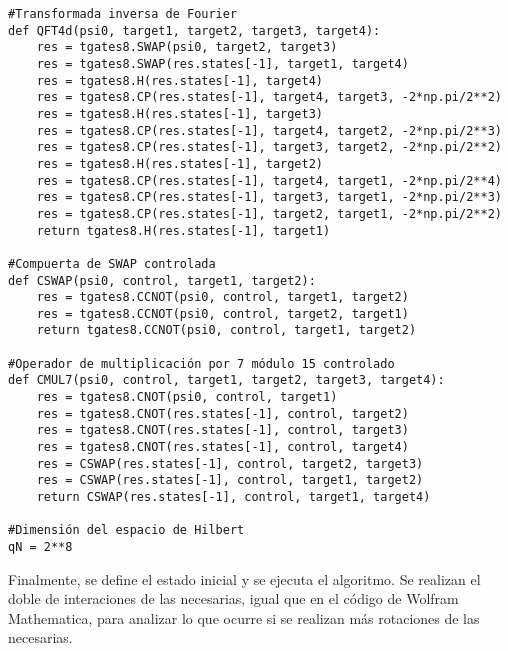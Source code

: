 \begin{verbatim}
#Transformada inversa de Fourier
def QFT4d(psi0, target1, target2, target3, target4):
    res = tgates8.SWAP(psi0, target2, target3)
    res = tgates8.SWAP(res.states[-1], target1, target4)
    res = tgates8.H(res.states[-1], target4)
    res = tgates8.CP(res.states[-1], target4, target3, -2*np.pi/2**2)
    res = tgates8.H(res.states[-1], target3)
    res = tgates8.CP(res.states[-1], target4, target2, -2*np.pi/2**3)
    res = tgates8.CP(res.states[-1], target3, target2, -2*np.pi/2**2)
    res = tgates8.H(res.states[-1], target2)
    res = tgates8.CP(res.states[-1], target4, target1, -2*np.pi/2**4)
    res = tgates8.CP(res.states[-1], target3, target1, -2*np.pi/2**3)
    res = tgates8.CP(res.states[-1], target2, target1, -2*np.pi/2**2)
    return tgates8.H(res.states[-1], target1)

#Compuerta de SWAP controlada
def CSWAP(psi0, control, target1, target2):
    res = tgates8.CCNOT(psi0, control, target1, target2)
    res = tgates8.CCNOT(psi0, control, target2, target1)
    return tgates8.CCNOT(psi0, control, target1, target2)

#Operador de multiplicación por 7 módulo 15 controlado
def CMUL7(psi0, control, target1, target2, target3, target4):
    res = tgates8.CNOT(psi0, control, target1)
    res = tgates8.CNOT(res.states[-1], control, target2)
    res = tgates8.CNOT(res.states[-1], control, target3)
    res = tgates8.CNOT(res.states[-1], control, target4)
    res = CSWAP(res.states[-1], control, target2, target3)
    res = CSWAP(res.states[-1], control, target1, target2)
    return CSWAP(res.states[-1], control, target1, target4)

#Dimensión del espacio de Hilbert
qN = 2**8
\end{verbatim}

Finalmente, se define el estado inicial y se ejecuta el algoritmo. Se realizan el doble de interaciones de las necesarias, igual que en el código de Wolfram Mathematica, para analizar lo que ocurre si se realizan más rotaciones de las necesarias.

